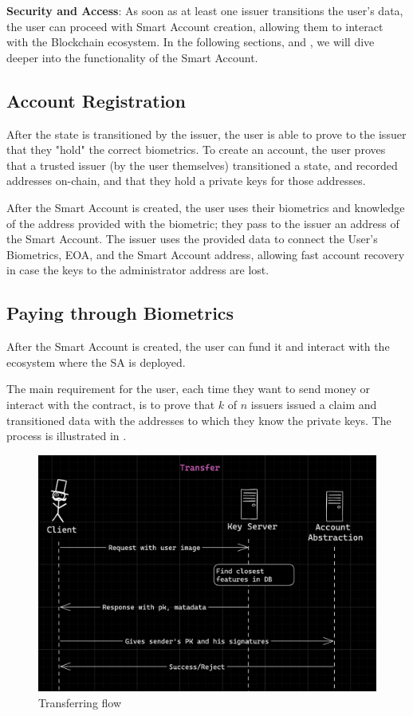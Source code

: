 \documentclass[a4, 14pt]{extarticle}
\begin{document}
\textbf{Security and Access}: As soon as at least one issuer transitions the user's data, the user can proceed with Smart Account creation, allowing them to interact with the Blockchain ecosystem. In the following sections,  and , we will dive deeper into the functionality of the Smart Account.

\subsection{Account Registration}\label{flow:registration}

After the state is transitioned by the issuer, the user is able to prove to the issuer that they "hold" the correct biometrics. To create an account, the user proves that a trusted issuer (by the user themselves) transitioned a state, and recorded addresses on-chain, and that they hold a private keys for those addresses.

After the Smart Account is created, the user uses their biometrics and knowledge of the address provided with the biometric; they pass to the issuer an address of the Smart Account. The issuer uses the provided data to connect the User's Biometrics, EOA, and the Smart Account address, allowing fast account recovery in case the keys to the administrator address are lost.

\subsection{Paying through Biometrics}\label{flow:paying}

After the Smart Account is created, the user can fund it and interact with the ecosystem where the SA is deployed. 

The main requirement for the user, each time they want to send money or interact with the contract, is to prove that $k$ of $n$ issuers issued a claim and transitioned data with the addresses to which they know the private keys. The process is illustrated in .

\begin{figure}
    \centering
    \includegraphics[width=\textwidth]{images/transfer_flow-modified.png}
    \caption{Transferring flow}
    \label{fig:transfer}
\end{figure}
\end{document}
